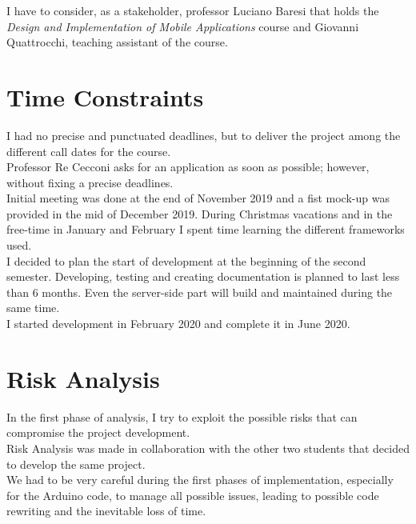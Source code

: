 I have to consider, as a stakeholder, professor Luciano Baresi that holds the \textit{Design and Implementation of Mobile Applications} course and Giovanni Quattrocchi, teaching assistant of the course.

\section{Time Constraints}
I had no precise and punctuated deadlines, but to deliver the project among the different call dates for the course.\\

Professor Re Cecconi asks for an application as soon as possible; however, without fixing a precise deadlines.\\

Initial meeting was done at the end of November 2019 and a fist mock-up was provided in the mid of December 2019. During Christmas vacations and in the free-time in January and February I spent time learning the different frameworks used.\\
I decided to plan the start of development at the beginning of the second semester. Developing, testing and creating documentation is planned to last less than 6 months. Even the server-side part will build and maintained during the same time.\\

I started development in February 2020 and complete it in June 2020.

\section{Risk Analysis}
In the first phase of analysis, I try to exploit the possible risks that can compromise the project development.\\

Risk Analysis was made in collaboration with the other two students that decided to develop the same project.\\

We had to be very careful during the first phases of implementation, especially for the Arduino code, to manage all possible issues, leading to possible code rewriting and the inevitable loss of time.


